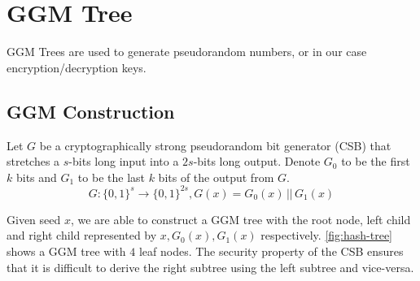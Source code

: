 \documentclass[hyp,a4paper,12pt,openbib]{socreport}
\begin{document}
\section{GGM Tree}
\label{sec:ggm}
GGM Trees \cite{Goldreich1986} are used to generate pseudorandom numbers, or in our case encryption/decryption keys.

\subsection{GGM Construction}
Let $G$ be a cryptographically strong pseudorandom bit generator (CSB) that stretches a $s$-bits long input into a $2s$-bits long output. Denote $G_0$ to be the first $k$ bits and $G_1$ to be the last $k$ bits of the output from $G$.
$$G: \{0, 1\}^s \rightarrow \{0, 1\}^{2s}, G(x) = G_0(x) \, || \, G_1(x)$$


Given seed $x$, we are able to construct a GGM tree with the root node, left child and right child represented by $x, G_0(x), G_1(x)$ respectively. \cref{fig:hash-tree} shows a GGM tree with $4$ leaf nodes. The security property of the CSB ensures that it is difficult to derive the right subtree using the left subtree and vice-versa.

\end{document}
